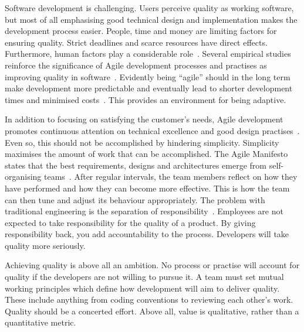 \documentclass[english]{tktltiki2}
\begin{document}
Software development is challenging. Users perceive quality as working software, but most of all emphasising good technical design and implementation makes the development process easier. People, time and money are limiting factors for ensuring quality. Strict deadlines and scarce resources have direct effects. Furthermore, human factors play a considerable role~\cite{DD08}. Several empirical studies reinforce the significance of Agile development processes and practises as improving quality in software~\cite{DD08, SS10, DNB12}. Evidently being “agile” should in the long term make development more predictable and eventually lead to shorter development times and minimised costs~\cite{DD08}. This provides an environment for being adaptive.

In addition to focusing on satisfying the customer’s needs, Agile development promotes continuous attention on technical excellence and good design practises~\cite{BBB01b}. Even so, this should not be accomplished by hindering simplicity. Simplicity maximises the amount of work that can be accomplished. The Agile Manifesto states that the best requirements, designs and architectures emerge from self-organising teams~\cite{BBB01b}. After regular intervals, the team members reflect on how they have performed and how they can become more effective. This is how the team can then tune and adjust its behaviour appropriately. The problem with traditional engineering is the separation of responsibility~\cite{Pop02}. Employees are not expected to take responsibility for the quality of a product. By giving responsibility back, you add accountability to the process. Developers will take quality more seriously.

Achieving quality is above all an ambition. No process or practise will account for quality if the developers are not willing to pursue it. A team must set mutual working principles which define how development will aim to deliver quality. These include anything from coding conventions to reviewing each other’s work. Quality should be a concerted effort. Above all, value is qualitative, rather than a quantitative metric.
\end{document}
